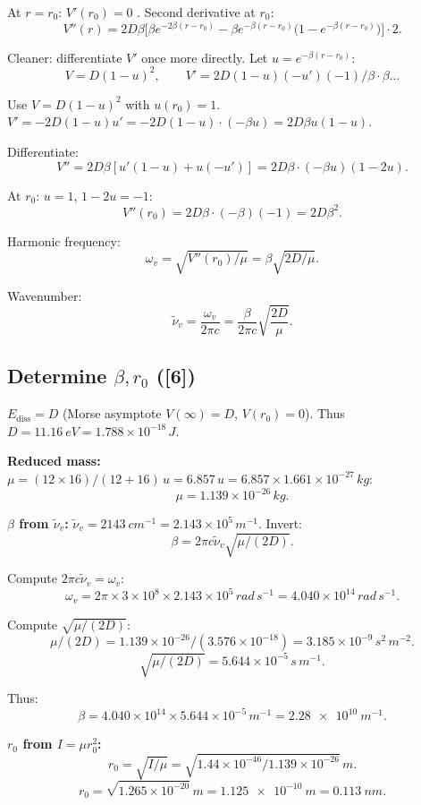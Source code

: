 \documentclass[11pt]{article}
\begin{document}
At $r=r_0$: $V'(r_0)=0$ \checkmark. Second derivative at $r_0$:
\[
V''(r) = 2D\beta\bigl[\beta e^{-2\beta(r-r_0)} - \beta e^{-\beta(r-r_0)}\bigl(1-e^{-\beta(r-r_0)}\bigr)\bigr] \cdot 2.
\]

Cleaner: differentiate $V'$ once more directly. Let $u = e^{-\beta(r-r_0)}$:
\[
V = D(1-u)^2,\qquad V' = 2D(1-u)(-u')(-1)/\beta \cdot \beta \dots
\]

Use $V = D(1-u)^2$ with $u(r_0)=1$. $V' = -2D(1-u)u' = -2D(1-u)\cdot(-\beta u) = 2D\beta u(1-u)$.

Differentiate:
\[
V'' = 2D\beta[u'(1-u) + u(-u')] = 2D\beta\cdot(-\beta u)(1-2u).
\]

At $r_0$: $u=1$, $1-2u=-1$:
\[
V''(r_0) = 2D\beta\cdot(-\beta)(-1) = 2 D\beta^2.
\]

Harmonic frequency:
\[
\omega_v = \sqrt{V''(r_0)/\mu} = \beta\sqrt{2D/\mu}.
\]

Wavenumber:
\[
\boxed{\;\tilde\nu_v = \frac{\omega_v}{2\pi c} = \frac{\beta}{2\pi c}\sqrt{\frac{2D}{\mu}}.\;}
\]

\subsection*{Determine $\beta, r_0$ ([6])}

$E_{\text{diss}} = D$ (Morse asymptote $V(\infty)=D$, $V(r_0)=0$). Thus
$D = \SI{11.16}{eV} = 1.788\times 10^{-18}\,\si{J}$.

\textbf{Reduced mass:} $\mu = (12\times 16)/(12+16)\,\si{u} = 6.857\,\si{u} = 6.857\times 1.661\times 10^{-27}\,\si{kg}$:
\[
\mu = 1.139\times 10^{-26}\,\si{kg}.
\]

\textbf{$\beta$ from $\tilde\nu_v$:} $\tilde\nu_v = \SI{2143}{cm^{-1}} = 2.143\times 10^5\,\si{m^{-1}}$. Invert:
\[
\beta = 2\pi c\tilde\nu_v\sqrt{\mu/(2D)}.
\]

Compute $2\pi c\tilde\nu_v = \omega_v$:
\[
\omega_v = 2\pi\times 3\times 10^8\times 2.143\times 10^5\,\si{rad\,s^{-1}} = 4.040\times 10^{14}\,\si{rad\,s^{-1}}.
\]

Compute $\sqrt{\mu/(2D)}$:
\[
\mu/(2D) = 1.139\times 10^{-26}/(3.576\times 10^{-18}) = 3.185\times 10^{-9}\,\si{s^2\,m^{-2}}.
\]
\[
\sqrt{\mu/(2D)} = 5.644\times 10^{-5}\,\si{s\,m^{-1}}.
\]

Thus:
\[
\beta = 4.040\times 10^{14}\times 5.644\times 10^{-5}\,\si{m^{-1}} = \boxed{\SI{2.28e10}{m^{-1}}}.
\]

\textbf{$r_0$ from $I = \mu r_0^2$:}
\[
r_0 = \sqrt{I/\mu} = \sqrt{1.44\times 10^{-46}/1.139\times 10^{-26}}\,\si{m}.
\]
\[
r_0 = \sqrt{1.265\times 10^{-20}}\,\si{m} = \boxed{\SI{1.125e-10}{m}} = \SI{0.113}{nm}.
\]
\end{document}
